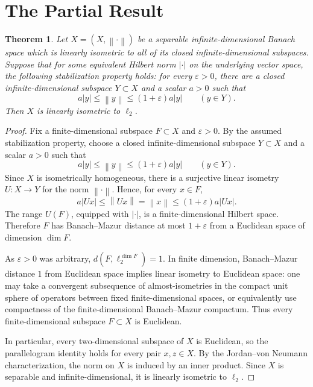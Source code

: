 \documentclass[11pt]{article}
\newtheorem{theorem}{Theorem}
\newcommand{\ellTwo}{\ell_2}
\newcommand{\norm}[1]{\left\lVert #1 \right\rVert}
\newcommand{\hnorm}[1]{\left\lvert #1 \right\rvert}
\begin{document}
\section*{The Partial Result}

\begin{theorem}
Let \(X=(X,\norm{\cdot})\) be a separable infinite-dimensional Banach space
which is linearly isometric to all of its closed infinite-dimensional
subspaces. Suppose that for some equivalent Hilbert norm \(\hnorm{\cdot}\) on
the underlying vector space, the following stabilization property holds:
for every \(\varepsilon>0\), there are a closed infinite-dimensional subspace
\(Y\subset X\) and a scalar \(a>0\) such that
\[
  a\hnorm{y}\leq \norm{y}\leq (1+\varepsilon)a\hnorm{y}
  \qquad (y\in Y).
\]
Then \(X\) is linearly isometric to \(\ellTwo\).
\end{theorem}

\begin{proof}
Fix a finite-dimensional subspace \(F\subset X\) and \(\varepsilon>0\). By the
assumed stabilization property, choose a closed infinite-dimensional
subspace \(Y\subset X\) and a scalar \(a>0\) such that
\[
  a\hnorm{y}\leq \norm{y}\leq (1+\varepsilon)a\hnorm{y}
  \qquad (y\in Y).
\]
Since \(X\) is isometrically homogeneous, there is a surjective linear isometry
\(U:X\to Y\) for the norm \(\norm{\cdot}\). Hence, for every \(x\in F\),
\[
  a\hnorm{Ux}\leq \norm{Ux}=\norm{x}\leq (1+\varepsilon)a\hnorm{Ux}.
\]
The range \(U(F)\), equipped with \(\hnorm{\cdot}\), is a finite-dimensional
Hilbert space. Therefore \(F\) has Banach--Mazur distance at most
\(1+\varepsilon\) from a Euclidean space of dimension \(\dim F\).

As \(\varepsilon>0\) was arbitrary, \(d(F,\ell_2^{\dim F})=1\). In finite
dimension, Banach--Mazur distance \(1\) from Euclidean space implies linear
isometry to Euclidean space: one may take a convergent subsequence of
almost-isometries in the compact unit sphere of operators between fixed
finite-dimensional spaces, or equivalently use compactness of the
finite-dimensional Banach--Mazur compactum. Thus every finite-dimensional
subspace \(F\subset X\) is Euclidean.

In particular, every two-dimensional subspace of \(X\) is Euclidean, so the
parallelogram identity holds for every pair \(x,z\in X\). By the
Jordan--von Neumann characterization, the norm on \(X\) is induced by an inner
product. Since \(X\) is separable and infinite-dimensional, it is linearly
isometric to \(\ellTwo\).
\end{proof}
\end{document}
